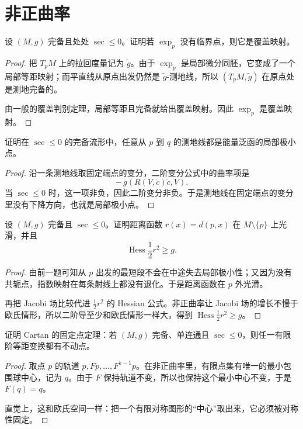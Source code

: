 \documentclass[11pt,a4paper,openany]{ctexbook}
\numberwithin{equation}{chapter}
\begin{document}
\section{非正曲率}

\begin{exercise}
设 \((M,g)\) 完备且处处 \(\sec\le 0\)。证明若 \(\exp_p\) 没有临界点，则它是覆盖映射。
\end{exercise}
\begin{proof}
把 \(T_pM\) 上的拉回度量记为 \(\tilde g\)。由于 \(\exp_p\) 是局部微分同胚，它变成了一个局部等距映射；而平直线从原点出发仍然是 \(\tilde g\)-测地线，所以 \((T_pM,\tilde g)\) 在原点处是测地完备的。

由一般的覆盖判别定理，局部等距且完备就给出覆盖映射。因此 \(\exp_p\) 是覆盖映射。
\end{proof}

\begin{exercise}
证明在 \(\sec\le 0\) 的完备流形中，任意从 \(p\) 到 \(q\) 的测地线都是能量泛函的局部极小点。
\end{exercise}
\begin{proof}
沿一条测地线取固定端点的变分，二阶变分公式中的曲率项是
\[
-\,g(R(V,\dot c)\dot c,V).
\]
当 \(\sec\le 0\) 时，这一项非负，因此二阶变分非负。于是测地线在固定端点的变分里没有下降方向，也就是局部极小点。
\end{proof}

\begin{exercise}
设 \((M,g)\) 完备且 \(\sec\le 0\)。证明距离函数 \(r(x)=d(p,x)\) 在 \(M\setminus\{p\}\) 上光滑，并且
\[
\operatorname{Hess}\frac12 r^2\ge g.
\]
\end{exercise}
\begin{proof}
由前一题可知从 \(p\) 出发的最短段不会在中途失去局部极小性；又因为没有共轭点，指数映射在每条射线上都没有退化。于是距离函数在 \(p\) 外光滑。

再把 Jacobi 场比较代进 \( \frac12 r^2 \) 的 Hessian 公式。非正曲率让 Jacobi 场的增长不慢于欧氏情形，所以二阶导至少和欧氏情形一样大，得到 \(\operatorname{Hess}\frac12 r^2\ge g\)。
\end{proof}

\begin{exercise}
证明 Cartan 的固定点定理：若 \((M,g)\) 完备、单连通且 \(\sec\le 0\)，则任一有限阶等距变换都有不动点。
\end{exercise}
\begin{proof}
取点 \(p\) 的轨道 \(p,Fp,\dots,F^{k-1}p\)。在非正曲率里，有限点集有唯一的最小包围球中心，记为 \(q\)。由于 \(F\) 保持轨道不变，所以也保持这个最小中心不变，于是 \(F(q)=q\)。

直觉上，这和欧氏空间一样：把一个有限对称图形的“中心”取出来，它必须被对称性固定。
\end{proof}
\end{document}
